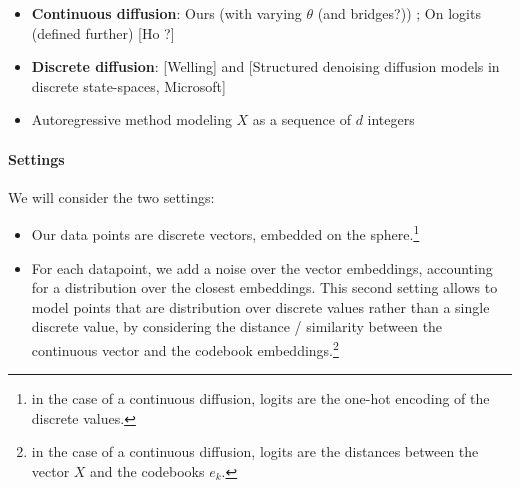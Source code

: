 \documentclass{article}
\begin{document}
\begin{itemize}
	\item \textbf{Continuous diffusion}: Ours (with varying $\theta$ (and bridges?)) ; On logits (defined further) [Ho ?]
	\item \textbf{Discrete diffusion}: [Welling] and [Structured denoising diffusion models in discrete state-spaces, Microsoft]
	\item Autoregressive method modeling $X$ as a sequence of $d$ integers
\end{itemize}

\paragraph{Settings} We will consider the two settings:

\begin{itemize}
	\item Our data points are discrete vectors, embedded on the sphere.\footnote{in the case of a continuous diffusion, logits are the one-hot encoding of the discrete values.}
	\item For each datapoint, we add a noise over the vector embeddings, accounting for a distribution over the closest embeddings. This second setting allows to model points that are distribution over discrete values rather than a single discrete value, by considering the distance / similarity between the continuous vector and the codebook embeddings.\footnote{in the case of a continuous diffusion, logits are the distances between the vector $X$ and the codebooks $e_k$.}
\end{itemize}
\end{document}

